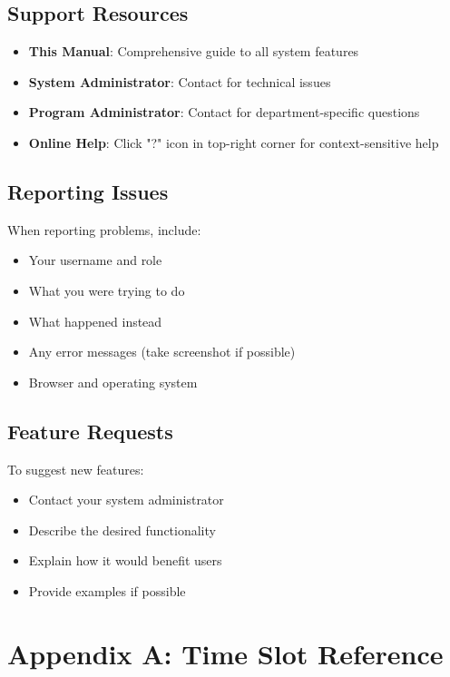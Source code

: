 \documentclass[12pt,a4paper]{article}
\begin{document}
\subsection{Support Resources}

\begin{itemize}
\item \textbf{This Manual}: Comprehensive guide to all system features
\item \textbf{System Administrator}: Contact for technical issues
\item \textbf{Program Administrator}: Contact for department-specific questions
\item \textbf{Online Help}: Click "?" icon in top-right corner for context-sensitive help
\end{itemize}

\subsection{Reporting Issues}

When reporting problems, include:
\begin{itemize}
\item Your username and role
\item What you were trying to do
\item What happened instead
\item Any error messages (take screenshot if possible)
\item Browser and operating system
\end{itemize}

\subsection{Feature Requests}

To suggest new features:
\begin{itemize}
\item Contact your system administrator
\item Describe the desired functionality
\item Explain how it would benefit users
\item Provide examples if possible
\end{itemize}

\appendix

\section{Appendix A: Time Slot Reference}
\end{document}

